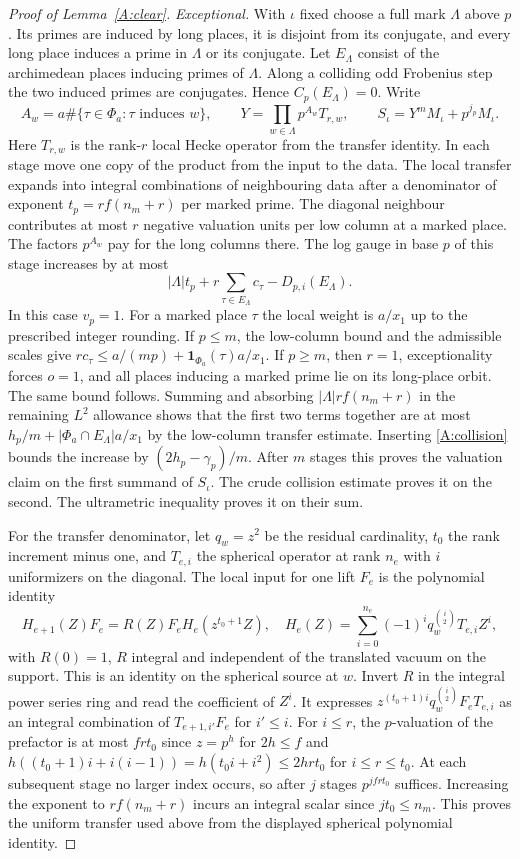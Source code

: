 \begin{proof}[Proof of Lemma~\ref{A:clear}]
\emph{Exceptional.} With $\iota$ fixed choose a full mark $\Lambda$ above $p$. Its primes are induced by long places, it is disjoint from its conjugate, and every long place induces a prime in $\Lambda$ or its conjugate. Let $E_\Lambda$ consist of the archimedean places inducing primes of $\Lambda$. Along a colliding odd Frobenius step the two induced primes are conjugates. Hence $C_p(E_\Lambda)=0$. Write
\[
 A_w=a\#\{\tau\in\Phi_a:\tau\text{ induces }w\},\qquad
 Y=\prod_{w\in\Lambda}p^{A_w}T_{r,w},\qquad
 S_\iota=Y^mM_\iota+p^{j_p}M_\iota .
\]
Here $T_{r,w}$ is the rank-$r$ local Hecke operator from the transfer identity. In each stage move one copy of the product from the input to the data. The local transfer expands into integral combinations of neighbouring data after a denominator of exponent $t_p=rf(n_m+r)$ per marked prime. The diagonal neighbour contributes at most $r$ negative valuation units per low column at a marked place. The factors $p^{A_w}$ pay for the long columns there. The log gauge in base $p$ of this stage increases by at most
\[
 |\Lambda|t_p+r\sum_{\tau\in E_\Lambda}c_\tau-D_{p,i}(E_\Lambda).
\]
In this case $v_p=1$. For a marked place $\tau$ the local weight is $a/x_1$ up to the prescribed integer rounding. If $p\le m$, the low-column bound and the admissible scales give $r c_\tau\le a/(mp)+\mathbf1_{\Phi_a}(\tau)a/x_1$. If $p\ge m$, then $r=1$, exceptionality forces $o=1$, and all places inducing a marked prime lie on its long-place orbit. The same bound follows. Summing and absorbing $|\Lambda|rf(n_m+r)$ in the remaining $L^2$ allowance shows that the first two terms together are at most $h_p/m+|\Phi_a\cap E_\Lambda|a/x_1$ by the low-column transfer estimate. Inserting \eqref{A:collision} bounds the increase by $(2h_p-\gamma_p)/m$. After $m$ stages this proves the valuation claim on the first summand of $S_\iota$. The crude collision estimate proves it on the second. The ultrametric inequality proves it on their sum.

For the transfer denominator, let $q_w=z^2$ be the residual cardinality, $t_0$ the rank increment minus one, and $T_{e,i}$ the spherical operator at rank $n_e$ with $i$ uniformizers on the diagonal. The local input for one lift $F_e$ is the polynomial identity
\[
 H_{e+1}(Z)F_e=R(Z)F_e H_e(z^{t_0+1}Z),\quad
 H_e(Z)=\sum_{i=0}^{n_e}(-1)^iq_w^{\binom i2}T_{e,i}Z^i ,
\]
with $R(0)=1$, $R$ integral and independent of the translated vacuum on the support. This is an identity on the spherical source at $w$. Invert $R$ in the integral power series ring and read the coefficient of $Z^i$. It expresses $z^{(t_0+1)i}q_w^{\binom i2}F_eT_{e,i}$ as an integral combination of $T_{e+1,i'}F_e$ for $i'\le i$. For $i\le r$, the $p$-valuation of the prefactor is at most $frt_0$ since $z=p^h$ for $2h\le f$ and $h((t_0+1)i+i(i-1))=h(t_0i+i^2)\le2hrt_0$ for $i\le r\le t_0$. At each subsequent stage no larger index occurs, so after $j$ stages $p^{jfrt_0}$ suffices. Increasing the exponent to $rf(n_m+r)$ incurs an integral scalar since $jt_0\le n_m$. This proves the uniform transfer used above from the displayed spherical polynomial identity.


\end{proof}
